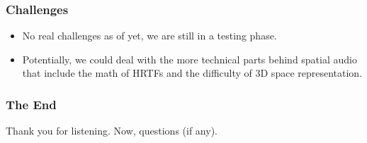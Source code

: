 \documentclass{beamer}
\begin{document}
\begin{frame}
    \frametitle{Challenges}
    \begin{itemize}
        \item No real challenges as of yet, we are still in a testing phase.
        \item Potentially, we could deal with the more technical parts behind spatial audio that include the math of HRTFs and the difficulty of 3D space representation.
    \end{itemize}
\end{frame}

\begin{frame}
    \frametitle{The End}
    Thank you for listening. Now, questions (if any).
\end{frame}
\end{document}
